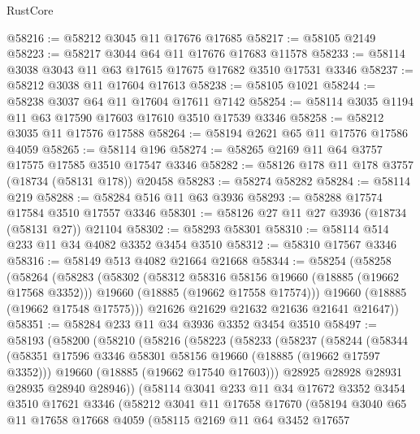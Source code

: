 \begin{lexlean}{RustCore}
\begin{coremodule}
@58216 := @58212 @3045 @11 @17676 @17685
@58217 := @58105 @2149
@58223 := @58217 @3044 @64 @11 @17676 @17683 @11578
@58233 := @58114 @3038 @3043 @11 @63 @17615 @17675 @17682 @3510 @17531 @3346
@58237 := @58212 @3038 @11 @17604 @17613
@58238 := @58105 @1021
@58244 := @58238 @3037 @64 @11 @17604 @17611 @7142
@58254 := @58114 @3035 @1194 @11 @63 @17590 @17603 @17610 @3510 @17539 @3346
@58258 := @58212 @3035 @11 @17576 @17588
@58264 := @58194 @2621 @65 @11 @17576 @17586 @4059
@58265 := @58114 @196
@58274 := @58265 @2169 @11 @64 @3757 @17575 @17585 @3510 @17547 @3346
@58282 := @58126 @178 @11 @178 @3757 (@18734 (@58131 @178)) @20458
@58283 := @58274 @58282
@58284 := @58114 @219
@58288 := @58284 @516 @11 @63 @3936
@58293 := @58288 @17574 @17584 @3510 @17557 @3346
@58301 := @58126 @27 @11 @27 @3936 (@18734 (@58131 @27)) @21104
@58302 := @58293 @58301
@58310 := @58114 @514 @233 @11 @34 @4082 @3352 @3454 @3510
@58312 := @58310 @17567 @3346
@58316 := @58149 @513 @4082 @21664 @21668
@58344 := @58254
    (@58258
      (@58264
        (@58283
          (@58302
            (@58312 @58316 @58156 @19660 (@18885 (@19662 @17568 @3352)))
            @19660
            (@18885 (@19662 @17558 @17574)))
          @19660
          (@18885 (@19662 @17548 @17575)))
        @21626
        @21629
        @21632
        @21636
        @21641
        @21647))
@58351 := @58284 @233 @11 @34 @3936 @3352 @3454 @3510
@58497 := @58193
    (@58200
      (@58210
        (@58216
          (@58223
            (@58233
              (@58237
                (@58244
                  (@58344
                    (@58351 @17596 @3346 @58301 @58156 @19660 (@18885 (@19662 @17597 @3352)))
                    @19660
                    (@18885 (@19662 @17540 @17603)))
                  @28925
                  @28928
                  @28931
                  @28935
                  @28940
                  @28946))
              (@58114
                @3041
                @233
                @11
                @34
                @17672
                @3352
                @3454
                @3510
                @17621
                @3346
                (@58212
                  @3041
                  @11
                  @17658
                  @17670
                  (@58194
                    @3040
                    @65
                    @11
                    @17658
                    @17668
                    @4059
                    (@58115
                      @2169
                      @11
                      @64
                      @3452
                      @17657

\end{coremodule}
\end{lexlean}
